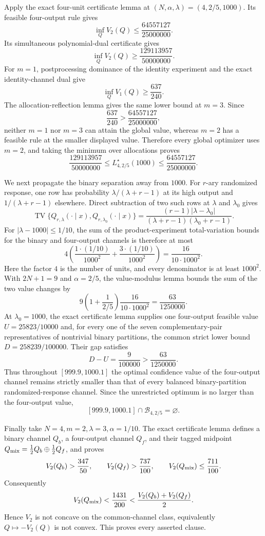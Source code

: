 Apply the exact four-unit certificate lemma at \((N,\alpha,\lambda)=(4,2/5,1000)\).  Its feasible four-output rule gives
\[
 \inf_QV_2(Q)\le \frac{64557127}{25000000}.
\]
Its simultaneous polynomial-dual certificate gives
\[
 \inf_QV_2(Q)\ge \frac{129113957}{50000000}.
\]
For \(m=1\), postprocessing dominance of the identity experiment and the exact identity-channel dual give
\[
 \inf_QV_1(Q)\ge\frac{637}{240}.
\]
The allocation-reflection lemma gives the same lower bound at \(m=3\).  Since
\[
 \frac{637}{240}>\frac{64557127}{25000000},
\]
neither \(m=1\) nor \(m=3\) can attain the global value, whereas \(m=2\) has a feasible rule at the smaller displayed value.  Therefore every global optimizer uses \(m=2\), and taking the minimum over allocations proves
\[
 \frac{129113957}{50000000}
 \le L^\star_{4,2/5}(1000)
 \le\frac{64557127}{25000000}.
\]

We next propagate the binary separation away from \(1000\).  For \(r\)-ary randomized response, one row has probability \(\lambda/(\lambda+r-1)\) at its high output and \(1/(\lambda+r-1)\) elsewhere.  Direct subtraction of two such rows at \(\lambda\) and \(\lambda_0\) gives
\[
 \operatorname{TV}\{Q_{r,\lambda}(\cdot\mid x),Q_{r,\lambda_0}(\cdot\mid x)\}
 =\frac{(r-1)|\lambda-\lambda_0|}
 {(\lambda+r-1)(\lambda_0+r-1)}.
\]
For \(|\lambda-1000|\le1/10\), the sum of the product-experiment total-variation bounds for the binary and four-output channels is therefore at most
\[
 4\left(\frac{1\cdot(1/10)}{1000^2}
 +\frac{3\cdot(1/10)}{1000^2}\right)
 =\frac{16}{10\cdot1000^2}.
\]
Here the factor \(4\) is the number of units, and every denominator is at least \(1000^2\).  With \(2N+1=9\) and \(\alpha=2/5\), the value-modulus lemma bounds the sum of the two value changes by
\[
 9\left(1+\frac1{2/5}\right)\frac{16}{10\cdot1000^2}
 =\frac{63}{1250000}.
\]
At \(\lambda_0=1000\), the exact certificate lemma supplies one four-output feasible value \(U=25823/10000\) and, for every one of the seven complementary-pair representatives of nontrivial binary partitions, the common strict lower bound \(D=258239/100000\).  Their gap satisfies
\[
 D-U=\frac9{100000}>\frac{63}{1250000}.
\]
Thus throughout \([999.9,1000.1]\) the optimal confidence value of the four-output channel remains strictly smaller than that of every balanced binary-partition randomized-response channel.  Since the unrestricted optimum is no larger than the four-output value,
\[
 [999.9,1000.1]\cap\mathcal B_{4,2/5}=\varnothing.
\]

Finally take \(N=4,m=2,\lambda=3,\alpha=1/10\).  The exact certificate lemma defines a binary channel \(Q_b\), a four-output channel \(Q_f\), and their tagged midpoint \(Q_{\rm mix}=\tfrac12Q_b\oplus\tfrac12Q_f\), and proves
\[
 V_2(Q_b)>\frac{347}{50},\qquad
 V_2(Q_f)>\frac{737}{100},\qquad
 V_2(Q_{\rm mix})\le\frac{711}{100}.
\]
Consequently
\[
 V_2(Q_{\rm mix})<\frac{1431}{200}
 <\frac{V_2(Q_b)+V_2(Q_f)}2.
\]
Hence \(V_2\) is not concave on the common-channel class, equivalently \(Q\mapsto -V_2(Q)\) is not convex.  This proves every asserted clause.

